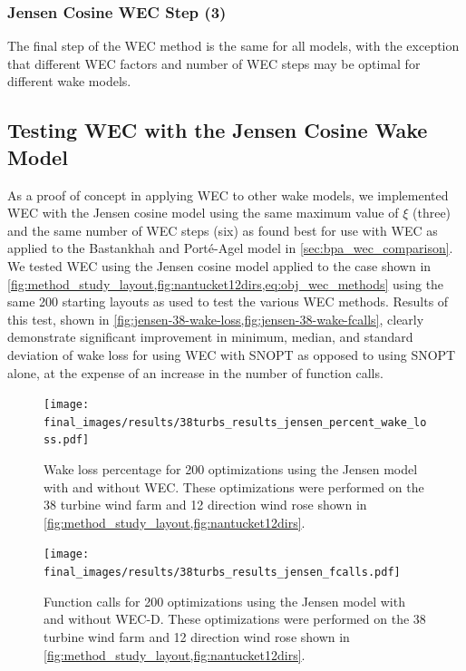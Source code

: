 \documentclass[a4paper]{jpconf}
\begin{document}
\subsubsection{Jensen Cosine WEC Step (3)}

The final step of the WEC method is the same for all models, with the exception that different WEC factors and number of WEC steps may be optimal for different wake models.

\subsection{Testing WEC with the Jensen Cosine Wake Model}
As a proof of concept in applying WEC to other wake models, we implemented WEC with the Jensen cosine model using the same maximum value of $\xi$ (three) and the same number of WEC steps (six) as found best for use with WEC as applied to the Bastankhah and Port\'{e}-Agel model in \cref{sec:bpa_wec_comparison}. We tested WEC using the Jensen cosine model applied to the case shown in \cref{fig:method_study_layout,fig:nantucket12dirs,eq:obj_wec_methods} using the same 200 starting layouts as used to test the various WEC methods. Results of this test, shown in \cref{fig:jensen-38-wake-loss,fig:jensen-38-wake-fcalls}, clearly demonstrate significant improvement in minimum, median, and standard deviation of wake loss for using WEC with SNOPT as opposed to using SNOPT alone, at the expense of an increase in the number of function calls.


\begin{figure}[h!]  
	\centering
	\begin{minipage}[t]{18pc}    
		\centering
		\texttt{[image: final\_images/results/38turbs\_results\_jensen\_percent\_wake\_loss.pdf]}
		\caption{Wake loss percentage for 200 optimizations using the Jensen model with and without WEC. These optimizations were performed on the 38 turbine wind farm and 12 direction wind rose shown in \cref{fig:method_study_layout,fig:nantucket12dirs}.}
		\label{fig:jensen-38-wake-loss}
	\end{minipage}\hspace{1pc}
	\begin{minipage}[t]{18pc}    
		\centering
		\texttt{[image: final\_images/results/38turbs\_results\_jensen\_fcalls.pdf]}
		\caption{Function calls for 200 optimizations using the Jensen model with and without WEC-D. These optimizations were performed on the 38 turbine wind farm and 12 direction wind rose shown in \cref{fig:method_study_layout,fig:nantucket12dirs}.}
		\label{fig:jensen-38-wake-fcalls}
	\end{minipage}
\end{figure}
\end{document}
